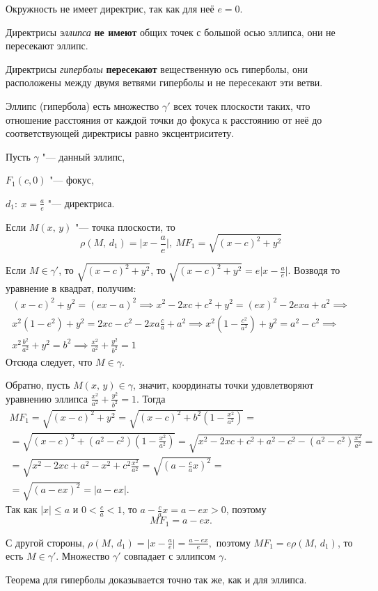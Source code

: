 Окружность не имеет директрис, так как для неё $e = 0$.

Директрисы \textit{эллипса} \textbf{не имеют} общих точек с большой осью эллипса,
они не пересекают эллипс.

Директрисы \textit{гиперболы} \textbf{пересекают} вещественную ось гиперболы, они
расположены между двумя ветвями гиперболы и не пересекают эти ветви.

\begin{theorem}
  Эллипс (гипербола) есть множество $\gamma'$
  всех точек плоскости таких, что отношение расстояния от каждой точки до фокуса к
  расстоянию от неё до соответствующей директрисы равно эксцентриситету.
\end{theorem}

\begin{Proof}
  Пусть $\gamma$ "--- данный эллипс, 
  
  $F_1(c, 0)$ "--- фокус, 
  
  $d_1: ~  x = \frac{a}{e}$ "--- директриса.

  Если $M(x, \, y)$ "--- точка плоскости, то
  $$
     \rho  (M, \, d_1) = \mathopen|x - \frac{a}{e}\mathclose|, ~ MF_1  = \sqrt{(x - c)^2 + y^2}
  $$

  Если $M \in \gamma'$, то  $\sqrt{(x - c)^2 + y^2}$, то $\sqrt{(x - c)^2 + y^2} = e \mathopen|x - \frac{a}{e}\mathclose|$. Возводя то уравнение в квадрат, получим:
  \begin{gather*} 
    (x - c)^2 + y^2 = (ex - a)^2 \implies x^2 - 2xc + c^2 + y^2 = (ex)^2 - 2exa + a^2 \implies \\
    x^2(1 - e^2) + y^2 = 2xc - c^2 - 2xa \frac{c}{a} + a^2 \implies x^2 (1 - \frac{c^2}{a^2}) + y^2 = a^2 - c^2 \implies \\
    x^2 \frac{b^2}{a^2} + y^2 = b^2 \implies \frac{x^2}{a^2} + \frac{y^2}{b^2} = 1
  \end{gather*}
  Отсюда следует, что $M \in \gamma$.

  Обратно, пусть $M(x, \, y) \in \gamma$, значит, координаты точки удовлетворяют уравнению эллипса $\frac{x^2}{a^2} + \frac{y^2}{b^2} = 1$. Тогда
  \begin{gather*}
    MF_1 = \sqrt{(x - c)^2 + y^2} = \sqrt{(x - c)^2 + b^2 (1 - \frac{x^2}{a^2})} = \\
    = \sqrt{(x - c)^2 + (a^2 - c^2)(1 - \frac{x^2}{a^2})} = \sqrt{x^2 - 2xc + c^2 + a^2 - c^2 - (a^2 - c^2)\frac{x^2}{a^2}} = \\
    = \sqrt{x^2 - 2xc + a^2 - x^2 + c^2 \frac{x^2}{a^2}} = \sqrt{(a - \frac{c}{a}x)^2} = \\
    = \sqrt{(a - ex)^2} = \mathopen|a - ex\mathclose|.
  \end{gather*}
  Так как $\mathopen|x\mathclose| \leq a$ и $0 < \frac{c}{a} < 1$, то $a - \frac{c}{a}x = a - ex > 0$, поэтому
  $$
    MF_1 = a - ex.
  $$

  С другой стороны, $\rho (M, \, d_1) = \mathopen|x - \frac{a}{e}\mathclose| = \frac{a - ex}{e},$ поэтому $MF_1 = e\rho(M, \, d_1)$, то есть $M \in \gamma'$. Множество $\gamma'$ совпадает с эллипсом $\gamma$.
  
  Теорема для гиперболы доказывается точно так же, как и для эллипса.
\end{Proof}

